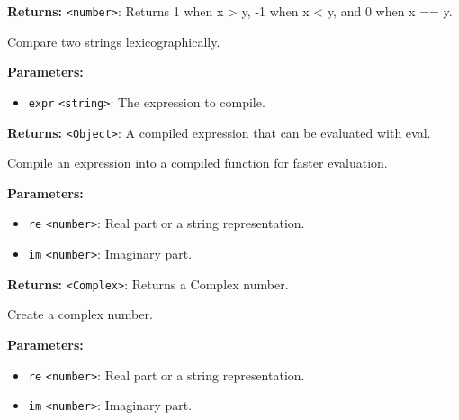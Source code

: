 \documentclass[12pt,a4paper]{article}
\begin{document}
\noindent \textbf{Returns:} \texttt{<number>}: Returns 1 when x > y, -1 when x < y, and 0 when x == y.

\noindent Compare two strings lexicographically.

\vspace{5mm}
\noindent {}


\noindent \textbf{Parameters:}
\begin{itemize}
  \item \texttt{expr} \texttt{<string>}: The expression to compile.
\end{itemize}

\noindent \textbf{Returns:} \texttt{<Object>}: A compiled expression that can be evaluated with \textasciigrave{}eval\textasciigrave{}.

\noindent Compile an expression into a compiled function for faster evaluation.

\vspace{5mm}
\noindent {}


\noindent \textbf{Parameters:}
\begin{itemize}
  \item \texttt{re} \texttt{<number>}: Real part or a string representation.
  \item \texttt{im} \texttt{<number>}: Imaginary part.
\end{itemize}

\noindent \textbf{Returns:} \texttt{<Complex>}: Returns a Complex number.

\noindent Create a complex number.

\vspace{5mm}
\noindent {}


\noindent \textbf{Parameters:}
\begin{itemize}
  \item \texttt{re} \texttt{<number>}: Real part or a string representation.
  \item \texttt{im} \texttt{<number>}: Imaginary part.
\end{itemize}
\end{document}
